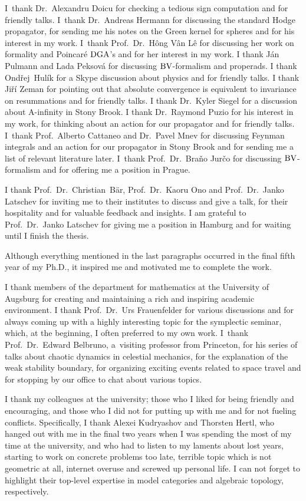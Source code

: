 \documentclass[\MainFolder/Text.tex]{subfiles}
\begin{document}
I~thank Dr.~Alexandru Doicu for checking a tedious sign computation and for friendly talks. I~thank Dr.~Andreas Hermann for discussing the standard Hodge propagator, for sending me his notes on the Green kernel for spheres and for his interest in my work. I~thank Prof.~Dr.~Hông Vân Lê for discussing her work on formality and Poincar\'e $\mathrm{DGA}$'s and for her interest in my work. I thank J\'an Pulmann and Lada Peksov\'a for discussing $\mathrm{BV}$-formalism and properads. I thank Ond\v{r}ej~Hul\'ik for a Skype discussion about physics and for friendly talks. I thank Ji\v{r}\'i Zeman for pointing out that absolute convergence is equivalent to invariance on resummations and for friendly talks. I thank Dr.~Kyler Siegel for a discussion about A-infinity in Stony Brook. I thank Dr.~Raymond Puzio for his interest in my work, for thinking about an action for our propagator and for friendly talks. I~thank Prof.~Alberto Cattaneo and Dr.~Pavel Mnev for discussing Feynman integrals and an action for our propagator in Stony Brook and for sending me a list of relevant literature later. I~thank Prof.~Dr.~Bra\v{n}o Jur\v{c}o for discussing $\mathrm{BV}$-formalism and for offering me a position in Prague.

I thank Prof.~Dr.~Christian~B\"ar, Prof.~Dr.~Kaoru Ono and Prof.~Dr.~Janko Latschev for inviting me to their institutes to discuss and give a talk, for their hospitality and for valuable feedback and insights. I am grateful to Prof.~Dr.~Janko Latschev for giving me a position in Hamburg and for waiting until I finish the thesis.

Although everything mentioned in the last paragraphs occurred in the final fifth year of my Ph.D., it inspired me and motivated me to complete the work.

I thank members of the department for mathematics at the University of Augsburg for creating and maintaining a rich and inspiring academic environment. I thank Prof.~Dr.~Urs Frauenfelder for various discussions and for always coming up with a highly interesting topic for the symplectic seminar, which, at the beginning, I often preferred to my own work. I~thank Prof.~Dr.~Edward Belbruno, a~visiting professor from Princeton, for his series of talks about chaotic dynamics in celestial mechanics, for the explanation of the weak stability boundary, for organizing exciting events related to space travel and for stopping by our office to chat about various topics.

I thank my colleagues at the university; those who I liked for being friendly and encouraging, and those who I did not for putting up with me and for not fueling conflicts. Specifically, I thank Alexei Kudryashov and Thorsten Hertl, who hanged out with me in the final two years when I was spending the most of my time at the university, and who had to listen to my laments about lost years, starting to work on concrete problems too late, terrible topic which is not geometric at all, internet overuse and screwed up personal life. I can not forget to highlight their top-level expertise in model categories and algebraic topology, respectively.
\end{document}
